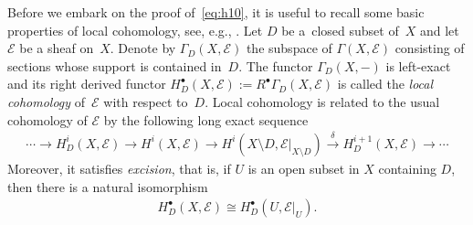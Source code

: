 \documentclass[10pt,a4paper]{amsart}
\numberwithin{equation}{section}
\newcommand{\cE}{\mathcal{E}}
\newcommand{\sE}{\mathscr{E}}
\newcommand{\iso}{\cong}
\begin{document}
Before we embark on the proof of~\eqref{eq:h10}, it is useful to
recall some basic properties of local cohomology, see, e.g.,
\cite[Chapter~III, Exercise~2.3]{Hartshorne1977}.  Let $D$ be a~closed subset of~$X$ and let~$\cE$ be a sheaf on~$X$.  Denote by
$\Gamma_D(X,\sE)$ the subspace of $\Gamma(X,\sE)$ consisting of
sections whose support is contained in~$D$.  The functor
$\Gamma_D(X,-)$ is left-exact and its right derived functor
$H^\bullet_D(X,\sE):=R^\bullet\Gamma_D(X,\sE)$ is called the
\emph{local cohomology} of~$\cE$ with respect to~$D$.  Local
cohomology is related to the usual cohomology of $\cE$ by the
following long exact sequence
\begin{gather}\label{eq:les}
  \cdots \to H^i_D(X,\sE) \to H^i(X,\sE) \to H^i(X{\setminus}
  D,\sE|_{X{\setminus} D}) \stackrel{\delta}{\to} H^{i+1}_D(X,\sE) \to
  \cdots
\end{gather}
Moreover, it satisf\/ies \emph{excision}, that is, if $U$ is an open
subset in $X$ containing $D$, then there is a natural isomorphism
\begin{gather*}
  H^\bullet_D(X,\cE) \iso H^\bullet_D(U,\cE|_U).
\end{gather*}
\end{document}
